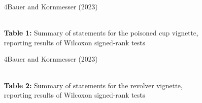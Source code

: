 \documentclass[xcolor=table,9pt,aspectratio=169]{beamer}
\begin{document}
\begin{frame}{\vspace*{10mm}4\hspace*{1em}Bauer and Kornmesser (2023)}
\vspace*{-5mm}
\begin{center}
   \\
   {\footnotesize\textbf{Table 1:} Summary of statements for the poisoned cup vignette,\\reporting results of Wilcoxon signed-rank tests}
\end{center}
\end{frame}


\begin{frame}{\vspace*{10mm}4\hspace*{1em}Bauer and Kornmesser (2023)}
\vspace*{-5mm}
\begin{center}
   \\
   {\footnotesize\textbf{Table 2:} Summary of statements for the revolver vignette,\\reporting results of Wilcoxon signed-rank tests}
\end{center}
\end{frame}
\end{document}
